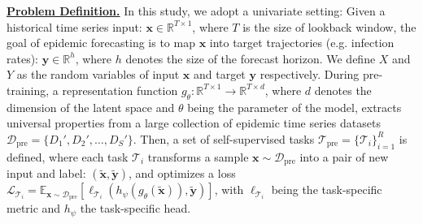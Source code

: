 



\underline{\textbf{Problem Definition.}} In this study, we adopt a univariate setting: Given a historical time series input: $\mathbf{x} \in \mathbb{R}^{T \times 1}$, where $T$ is the size of lookback window, the goal of epidemic forecasting is to map $\mathbf{x}$ into target trajectories (e.g. infection rates): $\mathbf{y} \in \mathbb{R}^{h}$, where $h$ denotes the size of the forecast horizon. We define $X$ and $Y$ as the random variables of input $\mathbf{x}$ and target $\mathbf{y}$ respectively.
During pre-training, a representation function \( g_\theta: \mathbb{R}^{T \times 1} \to \mathbb{R}^{T \times d} \), where $d$ denotes the dimension of the latent space and \( \theta \) being the parameter of the model, extracts universal properties from a large collection of epidemic time series datasets \( \mathcal{D}_{\text{pre}} = \{ D_1', D_2', \dots, D_S' \} \). 
Then, a set of self-supervised tasks \( \mathcal{T}_{\text{pre}} = \{ \mathcal{T}_i \}_{i=1}^R \) is defined, where each task \( \mathcal{T}_i \) transforms a sample \( \mathbf{x} \sim \mathcal{D}_{\text{pre}} \) into a pair of new input and label: \( (\mathbf{\tilde{x}}, \mathbf{\tilde{y}}) \), and optimizes a loss \( \mathcal{L}_{\mathcal{T}_i} = \mathbb{E}_{\mathbf{x} \sim \mathcal{D}_{\text{pre}}} [\ell_{\mathcal{T}_i}( h_\psi(g_\theta(\mathbf{\tilde{x}})), \mathbf{\tilde{y}})] \), with \( \ell_{\mathcal{T}_i} \) being the task-specific metric and \( h_\psi \) the task-specific head.




